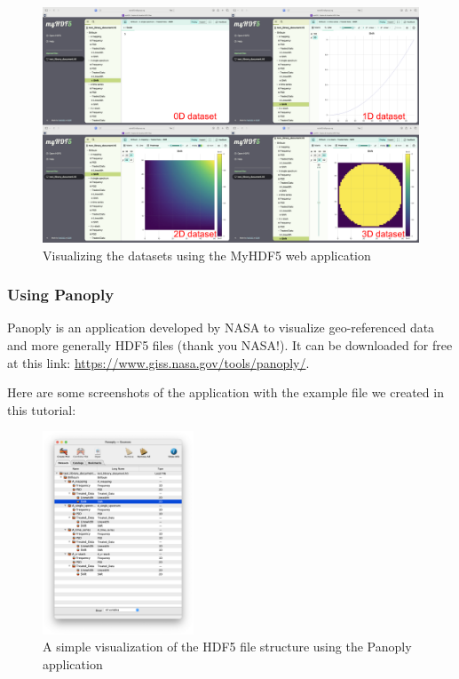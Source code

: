 \documentclass{article}
\begin{document}
\begin{figure}[H]
    \centering
    \includegraphics[width=\textwidth]{img/MyHDF5_visualizer.png}
    \caption{Visualizing the datasets using the MyHDF5 web application} 
    \label{fig:my_hdf5_datasets}
\end{figure}

\subsubsection{Using Panoply}

Panoply is an application developed by NASA to visualize geo-referenced data and more generally HDF5 files (thank you NASA!). It can be downloaded for free at this link: \url{https://www.giss.nasa.gov/tools/panoply/}. 

Here are some screenshots of the application with the example file we created in this tutorial: 

\begin{figure}[H]
    \centering
    \includegraphics[width=0.4\textwidth]{img/Panoply_developed_structure.png}
    \caption{A simple visualization of the HDF5 file structure using the Panoply application} 
    \label{fig:panoply_developed_structure}
\end{figure}
\end{document}
